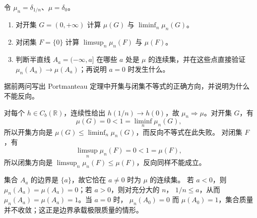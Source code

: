\begin{exercise}\label{b1:ex:12-portmanteau-directions}
令 \(\mu_n=\delta_{1/n}\)、\(\mu=\delta_0\)。
\begin{enumerate}
\item\label{b1:item:12-portmanteau-open-example}
对开集 \(G=(0,+\infty)\) 计算 \(\mu(G)\) 与 \(\liminf_n\mu_n(G)\)。
\item\label{b1:item:12-portmanteau-closed-example}
对闭集 \(F=\{0\}\) 计算 \(\limsup_n\mu_n(F)\) 与 \(\mu(F)\)。
\item\label{b1:item:12-portmanteau-continuity-example}
判断半直线 \(A_a=(-\infty,a]\) 在哪些 \(a\) 处是 \(\mu\) 的连续集，并在这些点直接验证
\(\mu_n(A_a)\to\mu(A_a)\)；再说明 \(a=0\) 时发生什么。
\end{enumerate}
据前两问写出 Portmanteau 定理中开集与闭集不等式的正确方向，并说明为什么不能反向。
\end{exercise}
\begin{solution}
对每个 \(h\in C_b(\mathbb R)\)，连续性给出 \(h(1/n)\to h(0)\)，故
\(\mu_n\Rightarrow\mu\)。对开集 \(G\)，有
\[
 \mu(G)=0<1=\liminf_n\mu_n(G),
\]
所以开集方向是 \(\mu(G)\leq\liminf_n\mu_n(G)\)，而反向不等式在此失败。
对闭集 \(F\)，有
\[
 \limsup_n\mu_n(F)=0<1=\mu(F),
\]
所以闭集方向是 \(\limsup_n\mu_n(F)\leq\mu(F)\)，反向同样不能成立。

集合 \(A_a\) 的边界是 \(\{a\}\)，故它恰在 \(a\ne0\) 时为 \(\mu\) 的连续集。
若 \(a<0\)，则 \(\mu_n(A_a)=\mu(A_a)=0\)；若 \(a>0\)，则对充分大的 \(n\)，
\(1/n\leq a\)，从而 \(\mu_n(A_a)=\mu(A_a)=1\)。当 \(a=0\) 时，
\(\mu_n(A_0)=0\) 而 \(\mu(A_0)=1\)，集合质量并不收敛；这正是边界承载极限质量的情形。
\end{solution}

